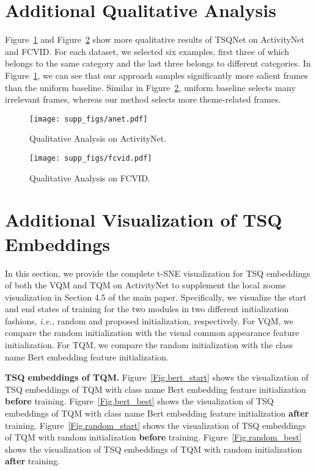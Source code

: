 \documentclass[runningheads]{llncs}
\newcommand{\figref}[1]{Figure~\ref{#1}}
\begin{document}
\section{Additional Qualitative Analysis}\label{appendix:qualitive_analysis}
\figref{Fig.anet} and \figref{Fig.fcvid} show more qualitative results of TSQNet on ActivityNet and FCVID. For each dataset, we selected six examples, first three of which belongs to the same category and the last three  belongs to different categories. In \figref{Fig.anet}, we can see that our approach samples significantly more salient frames than the uniform baseline. 
Similar in \figref{Fig.fcvid}, uniform baseline selects many irrelevant frames, whereas our method selects more theme-related frames.

\begin{figure}[t] \centering \texttt{[image: supp\_figs/anet.pdf]} \caption{Qualitative Analysis on ActivityNet.} \label{Fig.anet} \end{figure}

\begin{figure}[t] \centering \texttt{[image: supp\_figs/fcvid.pdf]} \caption{Qualitative Analysis on FCVID.} \label{Fig.fcvid} \end{figure}








\section{Additional Visualization of TSQ Embeddings}
In this section, we provide the complete t-SNE visualization for TSQ embeddings of  both the VQM and TQM on ActivityNet to supplement the local zooms visualization in Section 4.5 of the main paper. Specifically, we visualize the start and end states of training for the two modules in two different initialization fashions, \emph{i.e.,} random and proposed initialization, respectively. For VQM, we compare the random initialization with the visual common appearance feature initialization. For TQM, we compare the random initialization with the class name Bert embedding feature initialization.

\noindent \textbf{TSQ embeddings of TQM.}
\figref{Fig.bert_start} shows the visualization of TSQ embeddings of TQM with class name Bert embedding feature initialization \textbf{before} training.
\figref{Fig.bert_best} shows the visualization of TSQ embeddings of TQM with class name Bert embedding feature initialization \textbf{after} training.
\figref{Fig.random_start} shows the visualization of TSQ embeddings of TQM with random initialization \textbf{before} training.
\figref{Fig.random_best} shows the visualization of TSQ embeddings of TQM with random initialization \textbf{after} training.
\end{document}
